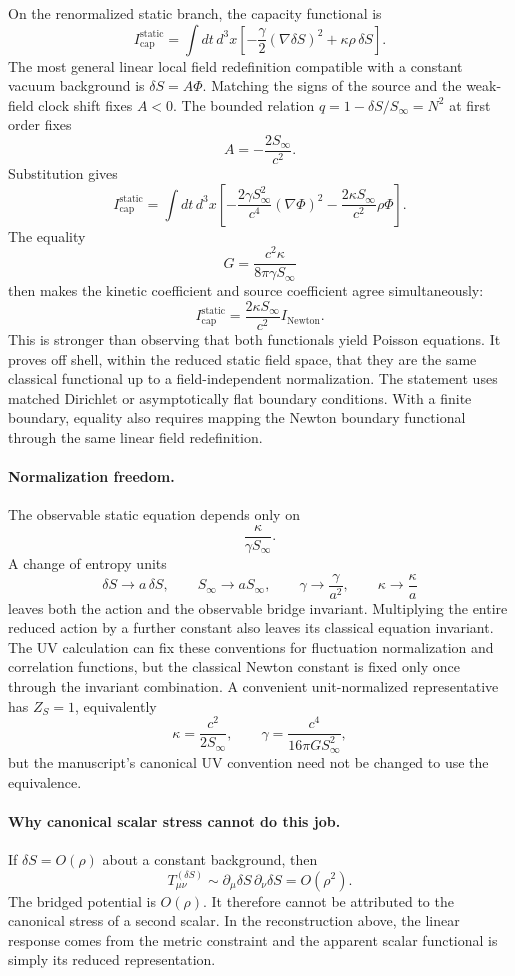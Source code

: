 \documentclass[11pt]{article}
\begin{document}
On the renormalized static branch, the capacity functional is
\[
I_{\mathrm{cap}}^{\mathrm{static}}
=
\int dt\,d^3x
\left[
-\frac{\gamma}{2}(\nabla\delta S)^2
+\kappa\rho\,\delta S
\right].
\]
The most general linear local field redefinition compatible with a constant vacuum background is $\delta S=A\Phi$. Matching the signs of the source and the weak-field clock shift fixes $A<0$. The bounded relation $q=1-\delta S/S_\infty=N^2$ at first order fixes
\[
A=-\frac{2S_\infty}{c^2}.
\]
Substitution gives
\[
I_{\mathrm{cap}}^{\mathrm{static}}
=
\int dt\,d^3x
\left[
-\frac{2\gamma S_\infty^2}{c^4}(\nabla\Phi)^2
-\frac{2\kappa S_\infty}{c^2}\rho\Phi
\right].
\]
The equality
\[
G=\frac{c^2\kappa}{8\pi\gamma S_\infty}
\]
then makes the kinetic coefficient and source coefficient agree simultaneously:
\[
\boxed{
I_{\mathrm{cap}}^{\mathrm{static}}
=
\frac{2\kappa S_\infty}{c^2}
I_{\mathrm{Newton}}.
}
\]
This is stronger than observing that both functionals yield Poisson equations. It proves off shell, within the reduced static field space, that they are the same classical functional up to a field-independent normalization.
The statement uses matched Dirichlet or asymptotically flat boundary conditions. With a finite boundary, equality also requires mapping the Newton boundary functional through the same linear field redefinition.

\paragraph{Normalization freedom.}
The observable static equation depends only on
\[
\frac{\kappa}{\gamma S_\infty}.
\]
A change of entropy units
\[
\delta S\to a\,\delta S,\qquad
S_\infty\to aS_\infty,\qquad
\gamma\to\frac{\gamma}{a^2},\qquad
\kappa\to\frac{\kappa}{a}
\]
leaves both the action and the observable bridge invariant. Multiplying the entire reduced action by a further constant also leaves its classical equation invariant. The UV calculation can fix these conventions for fluctuation normalization and correlation functions, but the classical Newton constant is fixed only once through the invariant combination. A convenient unit-normalized representative has $Z_S=1$, equivalently
\[
\kappa=\frac{c^2}{2S_\infty},
\qquad
\gamma=\frac{c^4}{16\pi GS_\infty^2},
\]
but the manuscript's canonical UV convention need not be changed to use the equivalence.

\paragraph{Why canonical scalar stress cannot do this job.}
If $\delta S=O(\rho)$ about a constant background, then
\[
T_{\mu\nu}^{(\delta S)}
\sim\partial_\mu\delta S\,\partial_\nu\delta S
=O(\rho^2).
\]
The bridged potential is $O(\rho)$. It therefore cannot be attributed to the canonical stress of a second scalar. In the reconstruction above, the linear response comes from the metric constraint and the apparent scalar functional is simply its reduced representation.
\end{document}
